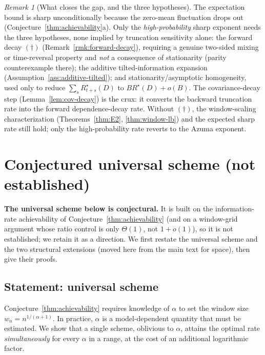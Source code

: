 \documentclass[11pt]{article}
\theoremstyle{plain}
\theoremstyle{definition}
\theoremstyle{remark}
\newtheorem{remark}[theorem]{Remark}
\begin{document}
\begin{remark}[What closes the gap, and the three hypotheses]
\label{rmk:freedman-hypotheses}
The expectation bound is sharp unconditionally because the
zero-mean fluctuation drops out (Conjecture~\ref{thm:achievability}a).
Only the \emph{high-probability} sharp exponent needs the three
hypotheses, none implied by truncation sensitivity alone: the
forward decay $(\dagger)$ (Remark~\ref{rmk:forward-decay}),
requiring a genuine two-sided mixing or time-reversal property and
\emph{not} a consequence of stationarity (parity counterexample
there); the additive tilted-information expansion
(Assumption~\ref{ass:additive-tilted}); and
stationarity/asymptotic homogeneity, used only to reduce
$\sum_s R^\star_{t+s}(D)$ to $B R^\star(D) + o(B)$. The
covariance-decay step (Lemma~\ref{lem:cov-decay}) is the crux: it
converts the backward truncation rate into the forward
dependence-decay rate. Without $(\dagger)$, the window-scaling
characterization (Theorems~\ref{thm:E2}, \ref{thm:window-lb}) and
the expected sharp rate still hold; only the high-probability rate
reverts to the Azuma exponent.
\end{remark}

\section{Conjectured universal scheme (not established)}
\label{app:universal}

\textbf{The universal scheme below is conjectural.} It is built on the
information-rate achievability of Conjecture~\ref{thm:achievability}
(and on a window-grid argument whose ratio control is only
$\Theta(1)$, not $1+o(1)$), so it is not established; we retain it as a
direction. We first restate the universal scheme and the two structural
extensions (moved here from the main text for space), then give
their proofs.

\subsection{Statement: universal scheme}
\label{sec:universal}

Conjecture~\ref{thm:achievability} requires knowledge of $\alpha$ to
set the window size $w_n = n^{1/(\alpha+1)}$. In practice, $\alpha$
is a model-dependent quantity that must be estimated. We show that
a single scheme, oblivious to $\alpha$, attains the optimal rate
\emph{simultaneously} for every $\alpha$ in a range, at the cost of
an additional logarithmic factor.
\end{document}
